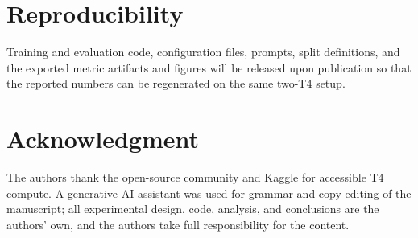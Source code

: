 \documentclass[conference]{IEEEtran}
\begin{document}
\section*{Reproducibility}
Training and evaluation code, configuration files, prompts, split definitions, and the exported metric artifacts and figures will be released upon publication so that the reported numbers can be regenerated on the same two-T4 setup.

\section*{Acknowledgment}
The authors thank the open-source community and Kaggle for accessible T4 compute. A generative AI assistant was used for grammar and copy-editing of the manuscript; all experimental design, code, analysis, and conclusions are the authors' own, and the authors take full responsibility for the content.
\end{document}
